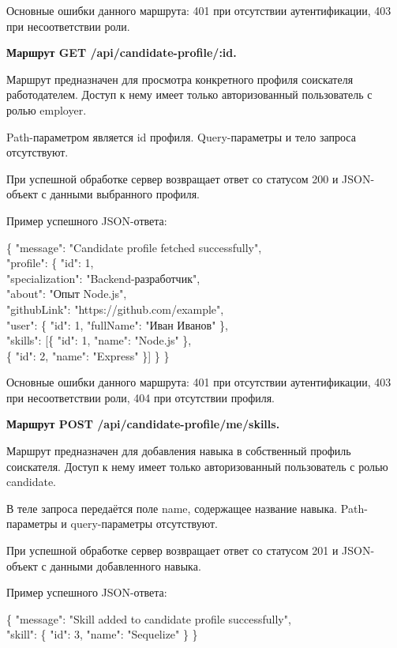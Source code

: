 Основные ошибки данного маршрута: 401 при отсутствии аутентификации, 403 при несоответствии роли.

\textbf{Маршрут GET /api/candidate-profile/:id.}

Маршрут предназначен для просмотра конкретного профиля соискателя работодателем. Доступ к нему имеет только авторизованный пользователь с ролью employer.

Path-параметром является id профиля. Query-параметры и тело запроса отсутствуют.

При успешной обработке сервер возвращает ответ со статусом 200 и JSON-объект с данными выбранного профиля.

Пример успешного JSON-ответа:

\begin{flushleft}
	\small\ttfamily
	\{ "message": "Candidate profile fetched successfully",\\
	"profile": \{ "id": 1,\\
	"specialization": "Backend-разработчик",\\
	"about": "Опыт Node.js",\\
	"githubLink": "https://github.com/example",\\
	"user": \{ "id": 1, "fullName": "Иван Иванов" \},\\
	"skills": [\{ "id": 1, "name": "Node.js" \},\\
	\{ "id": 2, "name": "Express" \}] \} \}
\end{flushleft}

Основные ошибки данного маршрута: 401 при отсутствии аутентификации, 403 при несоответствии роли, 404 при отсутствии профиля.

\textbf{Маршрут POST /api/candidate-profile/me/skills.}

Маршрут предназначен для добавления навыка в собственный профиль соискателя. Доступ к нему имеет только авторизованный пользователь с ролью candidate.

В теле запроса передаётся поле name, содержащее название навыка. Path-параметры и query-параметры отсутствуют.

При успешной обработке сервер возвращает ответ со статусом 201 и JSON-объект с данными добавленного навыка.

Пример успешного JSON-ответа:

\begin{flushleft}
	\small\ttfamily
	\{ "message": "Skill added to candidate profile successfully",\\
	"skill": \{ "id": 3, "name": "Sequelize" \} \}
\end{flushleft}

